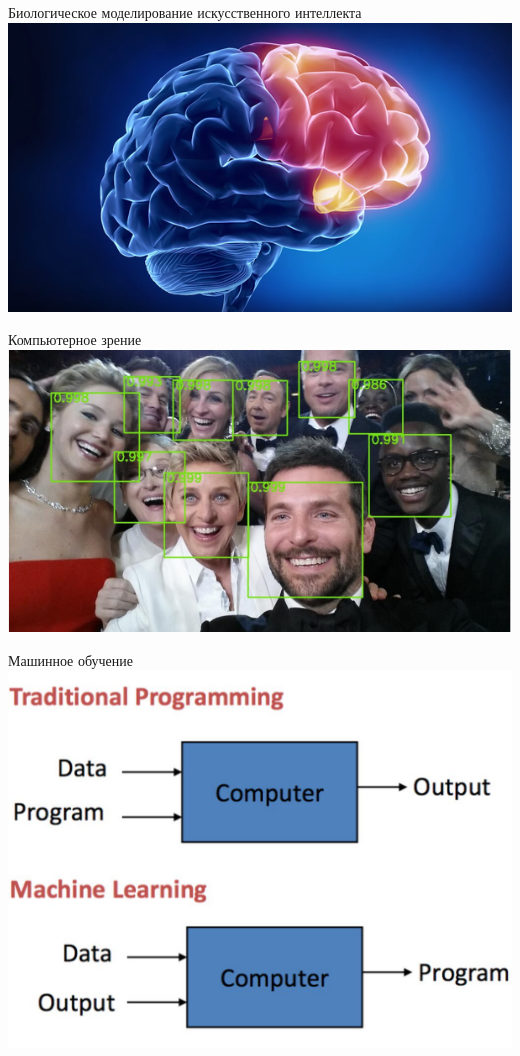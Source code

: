 \documentclass[10pt]{beamer}
\begin{document}
\begin{frame}{Биологическое моделирование искусственного интеллекта}
  \centering
  \includegraphics[width=0.8 \linewidth, height=0.8 \textheight, keepaspectratio]{images/brain}\\	
\end{frame}

\begin{frame}{Компьютерное зрение}
  \centering
  \includegraphics[width=0.8 \linewidth, height=0.8 \textheight, keepaspectratio]{images/vision}\\
\end{frame}

\begin{frame}{Машинное обучение}
  \centering
  \includegraphics[width=0.8 \linewidth, height=0.8 \textheight, keepaspectratio]{images/ml}\\
\end{frame}
\end{document}
